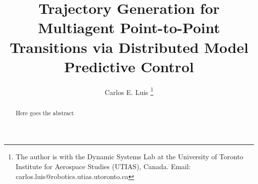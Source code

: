 \documentclass[letterpaper,10pt,conference,twocolumn]{ieeeconf}
\title{\LARGE \bf
Trajectory Generation for Multiagent Point-to-Point Transitions via Distributed Model Predictive Control
}
\author{Carlos E. Luis%
\thanks{The author is with the Dynamic Systems Lab at the University of Toronto Institute for Aerospace Studies (UTIAS), Canada. Email: carlos.luis@robotics.utias.utoronto.ca}%
}
\begin{document}
\maketitle
\thispagestyle{empty}
\pagestyle{empty}


\begin{abstract}
Here goes the abstract
\end{abstract}




\setcounter{section}{0}









% 
\end{document}
